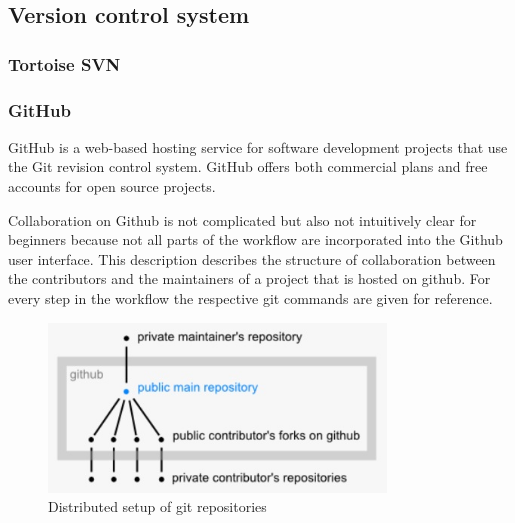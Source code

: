 \subsection{Version control system}

\subsubsection{Tortoise SVN}

\subsubsection{GitHub}

GitHub is a web-based hosting service for software development projects that use the Git revision control system. GitHub offers both commercial plans and free accounts for open source projects.\newline

Collaboration on Github is not complicated but also not intuitively clear for beginners because not all parts of the workflow are incorporated into the Github user interface. This description describes the structure of collaboration between the contributors and the maintainers of a project that is hosted on github. For every step in the workflow the respective git commands are given for reference.

\begin{figure}[github]
	\centering
	\includegraphics[width=0.8\textwidth]{prestudy/github.jpg}
	\caption{Distributed setup of git repositories}
	\label{fig:usecase}
\end{figure}
